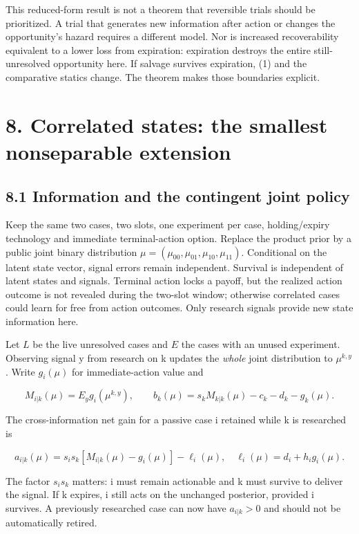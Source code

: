 \documentclass[
  11pt,
]{article}
\begin{document}
This reduced-form result is not a theorem that reversible trials should
be prioritized. A trial that generates new information after action or
changes the opportunity's hazard requires a different model. Nor is
increased recoverability equivalent to a lower loss from expiration:
expiration destroys the entire still-unresolved opportunity here. If
salvage survives expiration, (1) and the comparative statics change. The
theorem makes those boundaries explicit.

\section{8. Correlated states: the smallest nonseparable
extension}\label{correlated-states-the-smallest-nonseparable-extension}

\subsection{8.1 Information and the contingent joint
policy}\label{information-and-the-contingent-joint-policy}

Keep the same two cases, two slots, one experiment per case,
holding/expiry technology and immediate terminal-action option. Replace
the product prior by a public joint binary distribution
\(\mu=(\mu_{00},\mu_{01},\mu_{10},\mu_{11})\). Conditional on the latent
state vector, signal errors remain independent. Survival is independent
of latent states and signals. Terminal action locks a payoff, but the
realized action outcome is not revealed during the two-slot window;
otherwise correlated cases could learn for free from action outcomes.
Only research signals provide new state information here.

Let \(L\) be the live unresolved cases and \(E\) the cases with an
unused experiment. Observing signal y from research on k updates the
\emph{whole} joint distribution to \(\mu^{k,y}\). Write \(g_i(\mu)\) for
immediate-action value and

\[M_{i|k}(\mu)=E_y g_i(\mu^{k,y}),\qquad
b_k(\mu)=s_kM_{k|k}(\mu)-c_k-d_k-g_k(\mu).\]

The cross-information net gain for a passive case i retained while k is
researched is

\[a_{i|k}(\mu)=s_is_k[M_{i|k}(\mu)-g_i(\mu)]-\ell_i(\mu),
\quad\ell_i(\mu)=d_i+h_ig_i(\mu). \tag{8}\]

The factor \(s_is_k\) matters: i must remain actionable and k must
survive to deliver the signal. If k expires, i still acts on the
unchanged posterior, provided i survives. A previously researched case
can now have \(a_{i|k}>0\) and should not be automatically retired.
\end{document}
